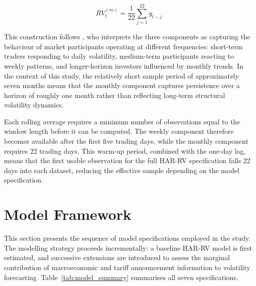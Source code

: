 \documentclass[12pt,a4paper]{report}
\begin{document}
\begin{equation}
RV_t^{(m)} = \frac{1}{22} \sum_{j=1}^{22} y_{t-j}
\end{equation}

\noindent This construction follows \cite{Corsi2009}, who interprets the three components as capturing the behaviour of market participants operating at different frequencies: short-term traders responding to daily volatility, medium-term participants reacting to weekly patterns, and longer-horizon investors influenced by monthly trends. In the context of this study, the relatively short sample period of approximately seven months means that the monthly component captures persistence over a horizon of roughly one month rather than reflecting long-term structural volatility dynamics.

Each rolling average requires a minimum number of observations equal to the window length before it can be computed. The weekly component therefore becomes available after the first five trading days, while the monthly component requires 22 trading days. This warm-up period, combined with the one-day lag, means that the first usable observation for the full HAR-RV specification falls 22 days into each dataset, reducing the effective sample depending on the model specification.

\section{Model Framework}
This section presents the sequence of model specifications employed in the study. The modelling strategy proceeds incrementally: a baseline HAR-RV model is first estimated, and successive extensions are introduced to assess the marginal contribution of macroeconomic and tariff announcement information to volatility forecasting. Table~\ref{tab:model_summary} summarises all seven specifications.
\end{document}
